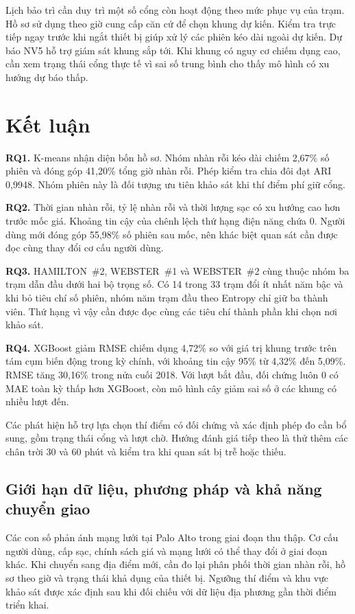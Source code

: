 \documentclass[conference,a4paper]{IEEEtran}
\begin{document}
Lịch bảo trì cần duy trì một số cổng còn hoạt động theo mức phục vụ của trạm. Hồ sơ sử dụng theo giờ cung cấp căn cứ để chọn khung dự kiến. Kiểm tra trực tiếp ngay trước khi ngắt thiết bị giúp xử lý các phiên kéo dài ngoài dự kiến. Dự báo NV5 hỗ trợ giám sát khung sắp tới. Khi khung có nguy cơ chiếm dụng cao, cần xem trạng thái cổng thực tế vì sai số trung bình cho thấy mô hình có xu hướng dự báo thấp.

\section{Kết luận}
\noindent\textbf{RQ1.} K-means nhận diện bốn hồ sơ. Nhóm nhàn rỗi kéo dài chiếm 2,67\% số phiên và đóng góp 41,20\% tổng giờ nhàn rỗi. Phép kiểm tra chia đôi đạt ARI 0,9948. Nhóm phiên này là đối tượng ưu tiên khảo sát khi thí điểm phí giữ cổng.

\noindent\textbf{RQ2.} Thời gian nhàn rỗi, tỷ lệ nhàn rỗi và thời lượng sạc có xu hướng cao hơn trước mốc giá. Khoảng tin cậy của chênh lệch thứ hạng điện năng chứa 0. Người dùng mới đóng góp 55,98\% số phiên sau mốc, nên khác biệt quan sát cần được đọc cùng thay đổi cơ cấu người dùng.

\noindent\textbf{RQ3.} HAMILTON~\#2, WEBSTER~\#1 và WEBSTER~\#2 cùng thuộc nhóm ba trạm dẫn đầu dưới hai bộ trọng số. Có 14 trong 33 trạm đổi ít nhất năm bậc và khi bỏ tiêu chí số phiên, nhóm năm trạm đầu theo Entropy chỉ giữ ba thành viên. Thứ hạng vì vậy cần được đọc cùng các tiêu chí thành phần khi chọn nơi khảo sát.

\noindent\textbf{RQ4.} XGBoost giảm RMSE chiếm dụng 4,72\% so với giá trị khung trước trên tám cụm biến động trong kỳ chính, với khoảng tin cậy 95\% từ 4,32\% đến 5,09\%. RMSE tăng 30,16\% trong nửa cuối 2018. Với lượt bắt đầu, đối chứng luôn 0 có MAE toàn kỳ thấp hơn XGBoost, còn mô hình cây giảm sai số ở các khung có nhiều lượt đến.

Các phát hiện hỗ trợ lựa chọn thí điểm có đối chứng và xác định phép đo cần bổ sung, gồm trạng thái cổng và lượt chờ. Hướng đánh giá tiếp theo là thử thêm các chân trời 30 và 60 phút và kiểm tra khi quan sát bị trễ hoặc thiếu.

\subsection{Giới hạn dữ liệu, phương pháp và khả năng chuyển giao}
Các con số phản ánh mạng lưới tại Palo Alto trong giai đoạn thu thập. Cơ cấu người dùng, cấp sạc, chính sách giá và mạng lưới có thể thay đổi ở giai đoạn khác. Khi chuyển sang địa điểm mới, cần đo lại phân phối thời gian nhàn rỗi, hồ sơ theo giờ và trạng thái khả dụng của thiết bị. Ngưỡng thí điểm và khu vực khảo sát được xác định sau khi đối chiếu với dữ liệu địa phương gần thời điểm triển khai.
\end{document}
